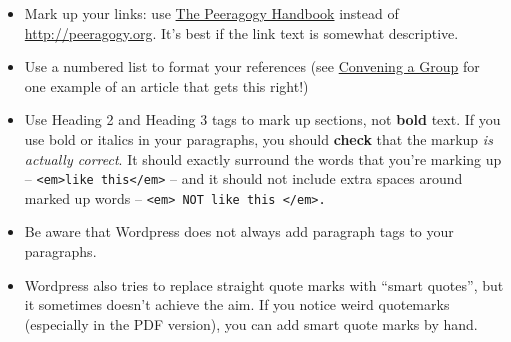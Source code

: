 \begin{itemize}
\item
  Mark up your links: use \href{http://peeragogy.org}{The Peeragogy
  Handbook} instead of
  \href{http://peeragogy.org}{http://peeragogy.org}. It's best if the
  link text is somewhat descriptive.
\item
  Use a numbered list to format your references (see
  \href{http://peeragogy.org/convening-a-group/}{Convening a Group} for
  one example of an article that gets this right!)
\item
  Use Heading 2 and Heading 3 tags to mark up sections, not
  \textbf{bold} text. If you use bold or italics in your paragraphs, you
  should \textbf{check} that the markup \emph{is actually correct}. It
  should exactly surround the words that you're marking up --
  \texttt{\textless{}em\textgreater{}like this\textless{}/em\textgreater{}}
  -- and it should not include extra spaces around marked up words --
  \texttt{\textless{}em\textgreater{} NOT like this \textless{}/em\textgreater{}.}
\item
  Be aware that Wordpress does not always add paragraph tags to your
  paragraphs.
\item
  Wordpress also tries to replace straight quote marks with ``smart
  quotes'', but it sometimes doesn't achieve the aim. If you notice
  weird quotemarks (especially in the PDF version), you can add smart
  quote marks by hand.
\end{itemize}
